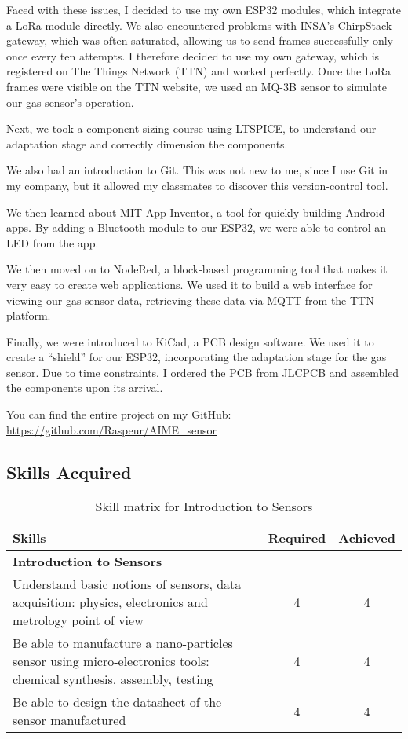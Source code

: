 Faced with these issues, I decided to use my own ESP32 modules, which integrate a LoRa module directly. We also encountered problems with INSA's ChirpStack gateway, which was often saturated, allowing us to send frames successfully only once every ten attempts. I therefore decided to use my own gateway, which is registered on The Things Network (TTN) and worked perfectly. Once the LoRa frames were visible on the TTN website, we used an MQ-3B sensor to simulate our gas sensor's operation.

Next, we took a component-sizing course using LTSPICE, to understand our adaptation stage and correctly dimension the components.

We also had an introduction to Git. This was not new to me, since I use Git in my company, but it allowed my classmates to discover this version-control tool.

We then learned about MIT App Inventor, a tool for quickly building Android apps. By adding a Bluetooth module to our ESP32, we were able to control an LED from the app.

We then moved on to NodeRed, a block-based programming tool that makes it very easy to create web applications. We used it to build a web interface for viewing our gas-sensor data, retrieving these data via MQTT from the TTN platform.

Finally, we were introduced to KiCad, a PCB design software. We used it to create a “shield” for our ESP32, incorporating the adaptation stage for the gas sensor. Due to time constraints, I ordered the PCB from JLCPCB and assembled the components upon its arrival.

You can find the entire project on my GitHub: \url{https://github.com/Raspeur/AIME_sensor}

\subsection{Skills Acquired}

\begin{table}[h!]
    \centering
    \renewcommand{\arraystretch}{1.5} %
    \begin{tabular}{|p{11cm}|c|c|}
    \hline
    \rowcolor[gray]{0.8}
    \textbf{Skills} & \textbf{Required} & \textbf{Achieved} \\ \hline
    \rowcolor[gray]{0.9} \textbf{Introduction to Sensors} &  &  \\ \hline
    Understand basic notions of sensors, data acquisition: physics, electronics and metrology point of view & 4 & 4 \\ \hline
    Be able to manufacture a nano-particles sensor using micro-electronics tools: chemical synthesis, assembly, testing & 4 & 4 \\ \hline
    Be able to design the datasheet of the sensor manufactured & 4 & 4 \\ \hline
    \end{tabular}
    \caption{Skill matrix for Introduction to Sensors}
    \label{table:skills-intro-sensors}
\end{table}

